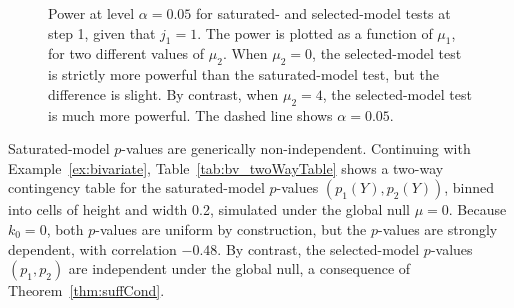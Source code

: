 \documentclass{article}
\begin{document}
\begin{figure}
\begin{subfigure}[t]{.4\textwidth}
  \end{subfigure}
  \caption{Power at level $\alpha=0.05$ for saturated- and selected-model tests at step 1, given that $j_1=1$. The power is plotted as a function of $\mu_1$, for two different values of $\mu_2$. When $\mu_2=0$, the selected-model test is strictly more powerful than the saturated-model test, but the difference is slight. By contrast, when $\mu_2=4$, the selected-model test is much more powerful. The dashed line shows $\alpha=0.05$.}
   \label{fig:bv_powCurves}
\end{figure}

Saturated-model $p$-values are generically non-independent. Continuing with Example~\ref{ex:bivariate}, Table~\ref{tab:bv_twoWayTable} shows a two-way contingency table for the saturated-model $p$-values $(p_1(Y), p_2(Y))$, binned into cells of height and width 0.2, simulated under the global null $\mu=0$. Because $k_0=0$, both $p$-values are uniform by construction, but the $p$-values are strongly dependent, with correlation $-0.48$. By contrast, the selected-model $p$-values $(p_1,p_2)$ are independent under the global null, a consequence of Theorem~\ref{thm:suffCond}.

\end{document}
